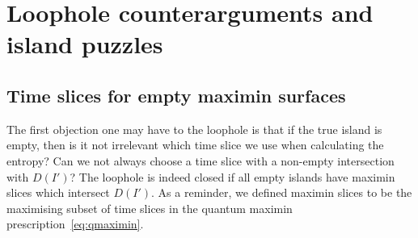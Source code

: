 \documentclass[a4paper,11pt]{article}
\newcommand{\st}[1]{\subsubsection*{\textcolor{blue}{#1}}}
\begin{document}
%
%
%
%
%
%
%
%



\section{Loophole counterarguments and island puzzles} \label{sec:Puzzles}

\subsection{Time slices for empty maximin surfaces}

The first objection one may have to the loophole is that if the true island is empty, then is it not irrelevant which time slice we use when calculating the entropy? Can we not always choose a time slice with a non-empty intersection with $D(I')$? The loophole is indeed closed if all empty islands have maximin slices which intersect $D(I')$. As a reminder, we defined maximin slices to be the maximising subset of time slices in the quantum maximin prescription~\eqref{eq:qmaximin}.
\end{document}
